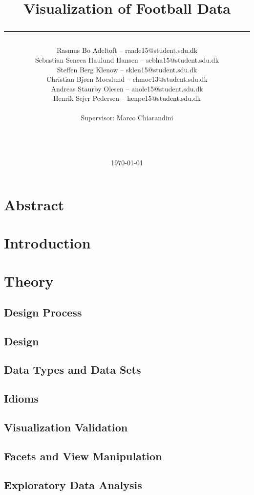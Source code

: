 \documentclass[a4paper,11pt]{article}
\title{Visualization of Football Data\\\rule{10cm}{0.5mm}}
\author{Rasmus Bo Adeltoft -- raade15@student.sdu.dk\\Sebastian Seneca Haulund Hansen -- sebha15@student.sdu.dk\\Steffen Berg Klenow -- sklen15@student.sdu.dk\\Christian Bjørn Moeslund -- chmoe13@student.sdu.dk\\Andreas Staurby Olesen -- anole15@student.sdu.dk\\Henrik Sejer Pedersen -- henpe15@student.sdu.dk
\\\\Supervisor: Marco Chiarandini\\\rule{5.5cm}{0.5mm}\\}
\date{\today}
\begin{document}
\maketitle
\newpage
\section*{Abstract}


\newpage
\tableofcontents
\newpage
\section{Introduction}


\section{Theory} %

\subsection{Design Process} %

\subsection{Design} %

\subsection{Data Types and Data Sets} %

\subsection{Idioms} %


\subsection{Visualization Validation} %

\subsection{Facets and View Manipulation} %


\subsection{Exploratory Data Analysis} %

\end{document}
